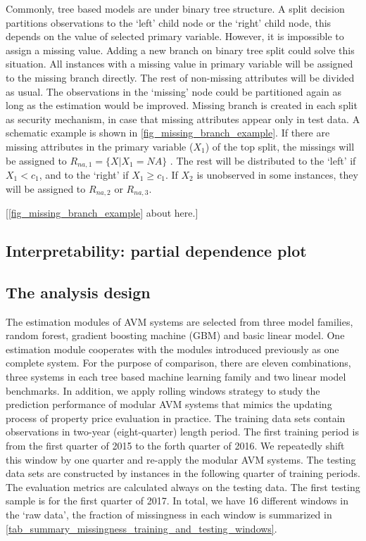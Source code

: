 Commonly, tree based models are under binary tree structure. A split decision partitions observations to the `left' child node or the `right' child node, this depends on the value of selected primary variable. However, it is impossible to assign a missing value. Adding a new branch on binary tree split could solve this situation. All instances with a missing value in primary variable will be assigned to the missing branch directly. The rest of non-missing attributes will be divided as usual. The observations in the `missing' node could be partitioned again as long as the estimation would be improved. Missing branch is created in each split as security mechanism, in case that missing attributes appear only in test data. A schematic example is shown in \autoref{fig_missing_branch_example}. If there are missing attributes in the primary variable ($X_1$) of the top split, the missings will be assigned to $R_{na,1} = \{ X|X_1 = NA \}$ . The rest will be distributed to the `left' if $X_1 < c_1$, and to the `right' if $X_1 \geq c_1$. If $X_2$ is unobserved in some instances, they will be assigned to $R_{na,2}$ or $R_{na,3}$.

%
\begin{center}
[\autoref{fig_missing_branch_example} about here.]
\end{center}
%

\subsection{Interpretability: partial dependence plot}

\subsection{The analysis design}

The estimation modules of AVM systems are selected from three model families, random forest, gradient boosting machine (GBM) and basic linear model. One estimation module cooperates with the modules introduced previously as one complete system. For the purpose of comparison, there are eleven combinations, three systems in each tree based machine learning family and two linear model benchmarks. In addition, we apply rolling windows strategy to study the prediction performance of modular AVM systems that mimics the updating process of property price evaluation in practice. The training data sets contain observations in two-year (eight-quarter) length period. The first training period is from the first quarter of 2015 to the forth quarter of 2016. We repeatedly shift this window by one quarter and re-apply the modular AVM systems. The testing data sets are constructed by instances in the following quarter of training periods. The evaluation metrics are calculated always on the testing data. The first testing sample is for the first quarter of 2017. In total, we have 16 different windows in the `raw data', the fraction of missingness in each window is summarized in \autoref{tab_summary_missingness_training_and_testing_windows}.

